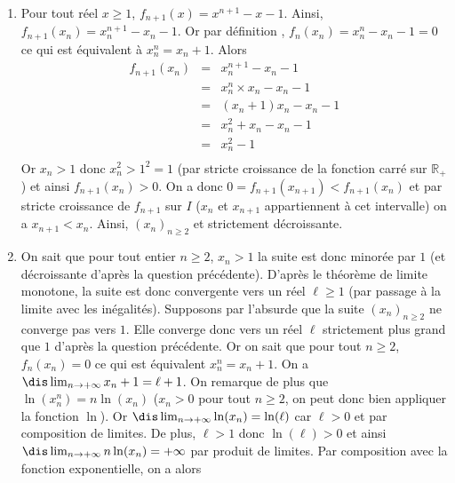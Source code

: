 \documentclass[a4paper,10pt]{report}
\begin{document}
\begin{enumerate}
\begin{center}
\end{center}
La fonction $f_n$ est continue et strictement croissante sur $I$ (fonction polynômiale), $\dis \lim_{x \rightarrow 1} f_n(x)=-1$, $\dis \lim_{ x \rightarrow + \infty} f_n(x)= + \infty$ et $0 \in ]-1, + \infty [$. D'après le théorème de bijection, il existe un unique réel $x_n \in ]1, + \infty[$ tel que $f_n(x_n)=0.$
\item Pour tout réel $x \geq 1$, $f_{n+1}(x) = x^{n+1}-x-1$. Ainsi, $f_{n+1}(x_n)= x_n^{n+1}-x_n-1$. Or par définition , $f_n(x_n) = x_n^{n}-x_n-1 = 0$ ce qui est équivalent à $x_n^n = x_n+1$. Alors
\[ \begin{array}{ccl}
f_{n+1}(x_n) & = & x_n^{n+1}-x_n-1 \\
& = & x_n^n \times x_n - x_n - 1 \\
& = & (x_n+1) x_n -x_n -1 \\
& = & x_n^2 +x_n -x_n -1  \\
& = & x_n^2 - 1 \\
\end{array} \]
Or $x_n>1$ donc $x_n^2 > 1^2=1$ (par stricte croissance de la fonction carré sur $\mathbb{R}_+$) et ainsi $f_{n+1}(x_n)>0$.  On a donc $0=f_{n+1}(x_{n+1}) < f_{n+1}(x_n)$ et par stricte croissance de $f_{n+1}$ sur $I$ ($x_n$ et $x_{n+1}$ appartiennent à cet intervalle) on a $x_{n+1} < x_n$. Ainsi, $(x_n)_{n \geq 2}$ et strictement décroissante.
\item On sait que pour tout entier $n \geq 2$, $x_n >1$ la suite est donc minorée par $1$ (et décroissante d'après la question précédente). D'après le théorème de limite monotone, la suite est donc convergente vers un réel $\ell \geq 1$ (par passage à la limite avec les inégalités). 
\noindent Supposons par l'absurde que la suite $(x_n)_{n \geq 2}$ ne converge pas vers $1$. Elle converge donc vers un réel $\ell$ strictement plus grand que $1$ d'après la question précédente. Or on sait que pour tout $n \geq 2$, $f_n(x_n)=0$ ce qui est équivalent $x_n^n = x_n + 1$. On a $\dis \lim_{n \rightarrow + \infty} x_n + 1 = \ell + 1$. On remarque de plus que $\ln(x_n^n) = n \ln(x_n)$ ($x_n>0$ pour tout $n \geq 2$, on peut donc bien appliquer la fonction $\ln$). Or $\dis \lim_{n \rightarrow + \infty} \ln(x_n) = \ln(\ell)$ car $\ell >0$ et par composition de limites. De plus, $\ell>1$ donc $\ln(\ell) >0$ et ainsi $\dis \lim_{n \rightarrow + \infty} n \ln(x_n) = + \infty$ par produit de limites. Par composition avec la fonction exponentielle, on a alors 

\end{enumerate}
\end{document}
